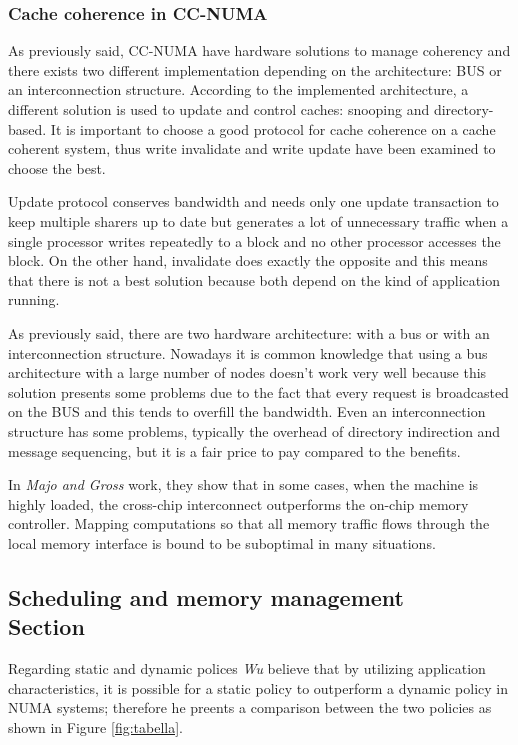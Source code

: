 \documentclass[a4paper,10pt]{article}
\begin{document}
\begin{multicols}{2}
\subsubsection{Cache coherence in CC-NUMA}
As previously said, CC-NUMA have hardware solutions to manage coherency and there exists two different implementation depending on the architecture: BUS or an interconnection structure. According to the implemented architecture, a different solution is used to update and control caches: snooping and directory-based. It is important to choose a good protocol for cache coherence on a cache coherent system, thus write invalidate and write update have been examined to choose the best.\par
\parindent 10mm Update protocol conserves bandwidth and needs only one update  transaction to keep multiple sharers up to date but generates a lot of unnecessary traffic when a single processor writes  repeatedly to a block and no other processor accesses the block. On the other hand, invalidate does exactly the opposite and this means that there is not a best solution because both depend on the kind of application running.\par
\parindent 10mm As previously said, there are two hardware architecture: with a bus or with an interconnection structure. Nowadays it is common knowledge that using a bus architecture with a large number of nodes doesn't work very well because this solution presents some problems due to the fact that every request is broadcasted on the BUS and this tends to overfill the bandwidth. Even an interconnection structure has some problems, typically the overhead of directory indirection and message sequencing, but it is a fair price to pay compared to the benefits.\cite{moh}\par
\parindent 10mm In \emph{Majo and Gross} work, they show that in some cases, when the machine is highly loaded, the cross-chip interconnect outperforms the on-chip memory controller. Mapping computations so that all memory traffic flows through the local memory interface is bound to be suboptimal in many situations. \cite{Majo_memorysystem}

\subsection{Scheduling and memory management \\ Section}

Regarding static and dynamic polices \emph{Wu} believe that by utilizing application characteristics, it is possible for a static policy to outperform a dynamic policy in NUMA systems; therefore he preents a comparison between the two policies as shown in Figure \ref{fig:tabella}.



\end{multicols}
\end{document}

